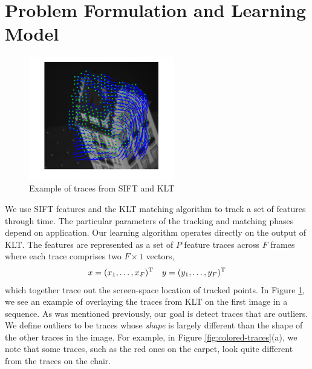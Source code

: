 \section{Problem Formulation and Learning Model}
\label{sec:formulation}

\begin{figure}[h]
	\begin{center}
		\includegraphics[width=2.5in]{figs/hotel-traces.png}
	\end{center}
	\caption{Example of traces from SIFT and KLT}
	\label{fig:traces}
\end{figure}


We use SIFT features and the KLT matching algorithm to track a set of features
through time.  The particular parameters of the tracking and matching phases
depend on application.  Our learning algorithm operates directly on the output
of KLT.  The features are represented as a set of $P$ feature traces across $F$
frames where each trace comprises two $F\times 1$ vectors,
\begin{align*}
x = (x_1, \ldots, x_F)^{\rm T} && y = (y_1, \ldots, y_F)^{\rm T}
\end{align*}
which together trace out the screen-space location of tracked points.  
In Figure \ref{fig:traces}, we see an example of overlaying the traces from KLT
on the first image in a sequence.  As was mentioned previously, our goal is
detect traces that are outliers.  We define outliers to be traces whose {\it
shape} is largely different than the shape of the other traces in the image.
For example, in Figure \ref{fig:colored-traces}(a), we note that some traces,
such as the red ones on the carpet, look quite different from the traces on the
chair.

